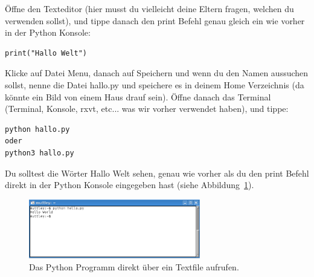 \begin{LINUX}
Öffne den Texteditor (hier musst du vielleicht deine Eltern fragen, welchen du verwenden sollst), und tippe danach den print Befehl genau gleich ein wie vorher in der Python Konsole:

\begin{Verbatim}[frame=single]
print("Hallo Welt")
\end{Verbatim}

Klicke auf Datei Menu, danach auf Speichern und wenn du den Namen aussuchen sollst, nenne die Datei hallo.py und speichere es in deinem Home Verzeichnis (da könnte ein Bild von einem Haus drauf sein). Öffne danach das Terminal (Terminal, Konsole, rxvt, etc... was wir vorher verwendet haben), und tippe:

\begin{Verbatim}[frame=single]
python hallo.py
oder
python3 hallo.py
\end{Verbatim}

Du solltest die Wörter Hallo Welt sehen, genau wie vorher als du den print Befehl direkt in der Python Konsole eingegeben hast (siehe Abbildung~\ref{fig9}).

\begin{figure}
\begin{center}
\includegraphics[width=75mm]{images/figure9}
\end{center}
\caption{Das Python Programm direkt über ein Textfile aufrufen.}\label{fig9}
\end{figure}
\end{LINUX}

